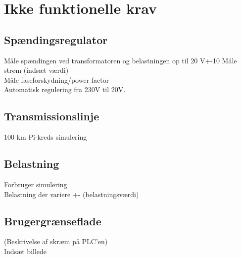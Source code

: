
\section{Ikke funktionelle krav}

\subsection{Spændingsregulator}

Måle spændingen ved transformatoren og belastningen op til 20 V+-10%
Måle strøm (indsæt værdi) \\
Måle faseforskydning/power factor \\
Automatisk regulering fra 230V til 20V. \\


\subsection{Transmissionslinje}
100 km Pi-kreds simulering \\


\subsection{Belastning}
Forbruger simulering \\
Belastning der variere +- (belastningsværdi)\\



\subsection{Brugergrænseflade}
(Beskrivelse af skræm på PLC’en) \\
Indsæt billede \\

